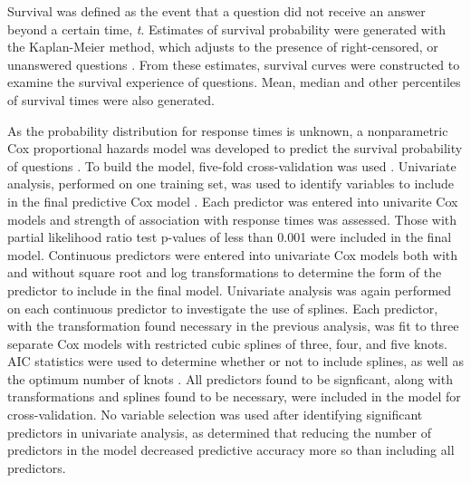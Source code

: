 \documentclass{article}
\begin{document}
Survival was defined as the event that a question did not receive an answer beyond a certain time, \textit{t}. Estimates of survival probability were generated with the Kaplan-Meier method, which adjusts to the presence of right-censored, or unanswered questions \cite{Bland1998}. From these estimates, survival curves were constructed to examine the survival experience of questions. Mean, median and other percentiles of survival times were also generated. 

As the probability distribution for response times is unknown, a nonparametric Cox proportional hazards model was developed to predict the survival probability of questions \cite{Moore2010}. To build the model, five-fold cross-validation was used \cite{Rodriguez2010}. Univariate analysis, performed on one training set, was used to identify variables to include in the final predictive Cox model \cite{Hammermeister1979}. Each predictor was entered into univarite Cox models and strength of association with response times was assessed. Those with partial likelihood ratio test p-values of less than 0.001 were included in the final model. Continuous predictors were entered into univariate Cox models both with and without square root and log transformations to determine the form of the predictor to include in the final model. Univariate analysis was again performed on each continuous predictor to investigate the use of splines. Each predictor, with the transformation found necessary in the previous analysis, was fit to three separate Cox models with restricted cubic splines of three, four, and five knots. AIC statistics were used to determine whether or not to include splines, as well as the optimum number of knots \cite{Harrell2015}. All predictors found to be signficant, along with transformations and splines found to be necessary, were included in the model for cross-validation. No variable selection was used after identifying significant predictors in univariate analysis, as \cite{Harrell2015} determined that reducing the number of predictors in the model decreased predictive accuracy more so than including all predictors. 
\end{document}
